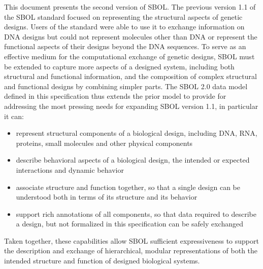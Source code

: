 This document presents the second version of SBOL.
The previous version 1.1 of the SBOL standard focused on representing the structural aspects of genetic designs. 
Users of the standard were able to use it to exchange information on DNA designs but could not represent molecules other than DNA or represent the functional aspects of their designs beyond the DNA sequences. 
To serve as an effective medium for the computational exchange of genetic designs, SBOL must be extended to capture more aspects of a designed system, including both structural and functional information, and the composition of complex structural and functional designs by combining simpler parts. 
The SBOL 2.0 data model defined in this specification thus extends the prior model to provide for addressing the most pressing needs for expanding SBOL version 1.1, in particular it can:
\begin{itemize}

\item represent structural components of a biological design, including DNA, RNA, proteins, small molecules and other physical components

\item describe behavioral aspects of a biological design, the intended or expected interactions and dynamic behavior

\item associate structure and function together, so that a single design can be understood both in terms of its structure and its behavior

\item support rich annotations of all components, so that data required to describe a design, but not formalized in this specification can be safely exchanged

\end{itemize}
Taken together, these capabilities allow SBOL sufficient expressiveness to support the description and exchange of hierarchical, modular representations of both the intended structure and function of designed biological systems.

